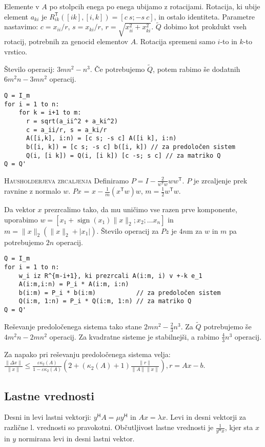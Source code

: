 \documentclass[a4paper,10pt]{article}
\theoremstyle{definition}
\newcommand{\T}{\mathsf{T}\!}
\renewcommand{\H}{\mathsf{H}\!}
\begin{document}
Elemente v $A$ po stolpcih enega po enega ubijamo z rotacijami. Rotacija, ki ubije element
$a_{ki}$ je $R_{ik}^\T([i k],[i,k]) = [c\ s; -s\ c]$, in ostalo identiteta.
Parametre nastavimo: $c = x_{ii}/r$, $s =
x_{ki}/r$, $r = \sqrt{x_{ii}^2+x_{ki}^2}$. $\tilde{Q}$ dobimo kot prokdukt vseh rotacij, potrebnih za genocid
elementov $A$. Rotacija spremeni samo $i$-to in $k$-to vrstico.

Število operacij: $3mn^2 -n^3$. Če potrebujemo $\tilde{Q}$, potem rabimo še dodatnih
$6m^2n - 3mn^2$ operacij.

\scriptsize
\begin{verbatim}
Q = I_m
for i = 1 to n:
    for k = i+1 to m:
      r = sqrt(a_ii^2 + a_ki^2)
      c = a_ii/r, s = a_ki/r
      A([i,k], i:n) = [c s; -s c] A([i k], i:n)
      b([i, k]) = [c s; -s c] b([i, k]) // za predoločen sistem
      Q(i, [i k]) = Q(i, [i k]) [c -s; s c] // za matriko Q
Q = Q'
\end{verbatim}
\normalsize

\textsc{Hausholderjeva zrcaljenja}
Definiramo $P = I - \frac{2}{w^\T w}ww^\T$. $P$ je zrcaljenje prek ravnine z normalo
$w$. $Px$ = $x - \frac{1}{m}(x^\T w)w$, $m = \frac12w^\T w$.

Da vektor $x$ prezrcalimo tako, da mu uničimo vse razen prve komponente,
uporabimo $w = [x_1 + \operatorname{sign}(x_1)\|x\|_2; x_2; \dots x_n]$ in $m =
\|x\|_2(\|x\|_2 + |x_1|)$. Število operacij za $Pz$ je $4n$m za $w$ in $m$ pa
potrebujemo $2n$ operacij.

\scriptsize
\begin{verbatim}
Q = I_m
for i = 1 to n:
    w_i iz R^{m-i+1}, ki prezrcali A(i:m, i) v +-k e_1
    A(i:m,i:n) = P_i * A(i:m, i:n)
    b(i:m) = P_i * b(i:m)           // za predoločen sistem
    Q(i:m, 1:n) = P_i * Q(i:m, 1:n) // za matriko Q
Q = Q'
\end{verbatim}
\normalsize

Reševanje predoločenega sistema tako stane $2mn^2 - \frac23n^3$. Za $\tilde{Q}$
potrebujemo še $4m^2n-2mn^2$ operacij. Za kvadratne sisteme je stabilnejši, a
rabimo $\frac43n^3$ operacij.

Za napako pri reševanju predoločenega sistema velja:
$\frac{\|\Delta x\|}{\|x\|} \leq \frac{\varepsilon\kappa_2(A)}{1-\varepsilon\kappa_2(A)}
\left(2+(\kappa_2(A) + 1)\frac{\|r\|}{\|A\|\|x\|} \right), r = Ax -b$.

\subsection*{Lastne vrednosti}
Desni in levi lastni vektorji: $y^\H A = \mu y^\H$ in $Ax = \lambda x$. Levi in
desni vektorji za različne l. vrednosti so pravokotni. Občutljivost lastne
vrednosti je $\frac{1}{y^\H x}$, kjer sta $x$ in $y$ normirana levi in desni
lastni vektor.
\end{document}
